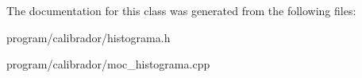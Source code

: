The documentation for this class was generated from the following files\+:\begin{DoxyCompactItemize}
\item 
program/calibrador/histograma.\+h\item 
program/calibrador/moc\+\_\+histograma.\+cpp\end{DoxyCompactItemize}
